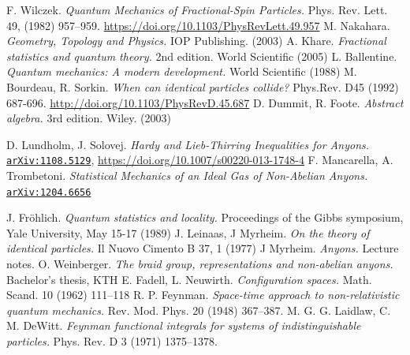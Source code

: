 \documentclass[a4paper,10pt,oneside]{book}
\theoremstyle{plain}
\theoremstyle{definition}
\theoremstyle{remark}
\begin{document}
\begin{thebibliography}{99}



   F. Wilczek. \textit{Quantum Mechanics of Fractional-Spin Particles.} Phys. Rev. Lett. 49, (1982) 957–959. \url{https://doi.org/10.1103/PhysRevLett.49.957}
   M. Nakahara. \textit{Geometry, Topology and Physics.} IOP Publishing. (2003)
   A. Khare. \textit{Fractional statistics and quantum theory.} 2nd edition. World Scientific (2005)
   L. Ballentine. \textit{Quantum mechanics: A modern development.} World Scientific (1988)
   M. Bourdeau, R. Sorkin. \textit{When can identical particles collide?} Phys.Rev. D45 (1992) 687-696. \url{http://doi.org/10.1103/PhysRevD.45.687}
   D. Dummit, R. Foote. \textit{Abstract algebra.} 3rd edition. Wiley. (2003)

   D. Lundholm, J. Solovej. \textit{Hardy and Lieb-Thirring Inequalities for Anyons.} \href{https://arxiv.org/abs/1108.5129}{\texttt{arXiv:1108.5129}}, \url{https://doi.org/10.1007/s00220-013-1748-4}
   F. Mancarella, A. Trombetoni. \textit{Statistical Mechanics of an Ideal Gas of Non-Abelian Anyons.} \href{https://arxiv.org/abs/1204.6656}{\texttt{arXiv:1204.6656}}

   J. Fröhlich. \textit{Quantum statistics and locality.} Proceedings of the Gibbs symposium, Yale University, May 15-17 (1989)
   J. Leinaas, J Myrheim. \textit{On the theory of identical particles.} Il Nuovo Cimento B 37, 1 (1977)
   J Myrheim. \textit{Anyons.} Lecture notes.
   O. Weinberger. \textit{The braid group, representations and non-abelian anyons.} Bachelor's thesis, KTH
   E. Fadell, L. Neuwirth. \textit{Configuration spaces.} Math. Scand. 10 (1962) 111–118
   R. P. Feynman. \textit{Space-time approach to non-relativistic quantum mechanics.} Rev. Mod. Phys. 20 (1948) 367–387.
   M. G. G. Laidlaw, C. M. DeWitt. \textit{Feynman functional integrals for systems of indistinguishable particles.} Phys. Rev. D 3 (1971) 1375–1378.


\end{thebibliography}
\end{document}
